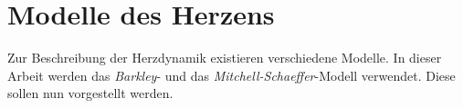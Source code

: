 \section{Modelle des Herzens}
Zur Beschreibung der Herzdynamik existieren verschiedene Modelle. In dieser Arbeit werden das \textit{Barkley}- und das \textit{Mitchell-Schaeffer}-Modell verwendet. Diese sollen nun vorgestellt werden.



